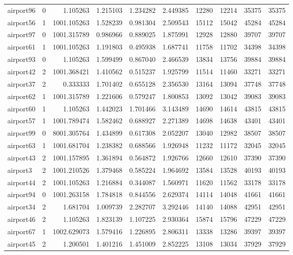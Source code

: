 \begin{longtable}{|l|r|r|r|r|r|r|r|r|r|}
airport96 & 0 & 1.105263 & 1.215103 & 1.234282 & 2.449385 & 12280 & 12214 & 35375 & 35375 \\
airport56 & 1 & 1001.105263 & 1.528239 & 0.981304 & 2.509543 & 15112 & 15042 & 45284 & 45284 \\
airport97 & 0 & 1001.315789 & 0.986966 & 0.889025 & 1.875991 & 12928 & 12880 & 39707 & 39707 \\
airport61 & 1 & 1001.105263 & 1.191803 & 0.495938 & 1.687741 & 11758 & 11702 & 34398 & 34398 \\
airport93 & 0 & 1.105263 & 1.599499 & 0.867040 & 2.466539 & 13834 & 13756 & 39884 & 39884 \\
airport42 & 2 & 1001.368421 & 1.410562 & 0.515237 & 1.925799 & 11514 & 11460 & 33271 & 33271 \\
airport37 & 2 & 0.333333 & 1.701402 & 0.655128 & 2.356530 & 13164 & 13094 & 37748 & 37748 \\
airport62 & 1 & 1001.315789 & 1.221606 & 0.579247 & 1.800853 & 13092 & 13042 & 39083 & 39083 \\
airport60 & 1 & 1.105263 & 1.442023 & 1.701466 & 3.143489 & 14690 & 14614 & 43815 & 43815 \\
airport57 & 1 & 1001.789474 & 1.582462 & 0.688927 & 2.271389 & 14698 & 14638 & 43401 & 43401 \\
airport99 & 0 & 8001.305764 & 1.434899 & 0.617308 & 2.052207 & 13040 & 12982 & 38507 & 38507 \\
airport63 & 1 & 1001.681704 & 1.238382 & 0.688566 & 1.926948 & 11232 & 11172 & 32045 & 32045 \\
airport43 & 2 & 1001.157895 & 1.361894 & 0.564872 & 1.926766 & 12660 & 12610 & 37390 & 37390 \\
airport3 & 2 & 1001.210526 & 1.379468 & 0.585224 & 1.964692 & 13584 & 13528 & 40193 & 40193 \\
airport44 & 2 & 1001.105263 & 1.216884 & 0.344087 & 1.560971 & 11620 & 11562 & 33178 & 33178 \\
airport94 & 0 & 1001.263158 & 1.784818 & 0.844556 & 2.629374 & 14114 & 14048 & 41661 & 41661 \\
airport34 & 2 & 1.681704 & 1.009739 & 2.282707 & 3.292446 & 14140 & 14088 & 42951 & 42951 \\
airport46 & 2 & 1.105263 & 1.823139 & 1.107225 & 2.930364 & 15874 & 15796 & 47229 & 47229 \\
airport67 & 1 & 1002.629073 & 1.579416 & 1.226895 & 2.806311 & 13338 & 13286 & 39397 & 39397 \\
airport45 & 2 & 1.200501 & 1.401216 & 1.451009 & 2.852225 & 13108 & 13034 & 37929 & 37929 \\

\end{longtable}
